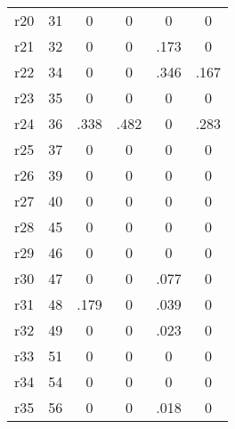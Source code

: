 \begin{table}[htbp]
\begin{tabular}{l*{5}{c}}
r20         &          31&           0&           0&           0&           0\\
r21         &          32&           0&           0&        .173&           0\\
r22         &          34&           0&           0&        .346&        .167\\
r23         &          35&           0&           0&           0&           0\\
r24         &          36&        .338&        .482&           0&        .283\\
r25         &          37&           0&           0&           0&           0\\
r26         &          39&           0&           0&           0&           0\\
r27         &          40&           0&           0&           0&           0\\
r28         &          45&           0&           0&           0&           0\\
r29         &          46&           0&           0&           0&           0\\
r30         &          47&           0&           0&        .077&           0\\
r31         &          48&        .179&           0&        .039&           0\\
r32         &          49&           0&           0&        .023&           0\\
r33         &          51&           0&           0&           0&           0\\
r34         &          54&           0&           0&           0&           0\\
r35         &          56&           0&           0&        .018&           0\\
\bottomrule
\end{tabular}
\end{table}
